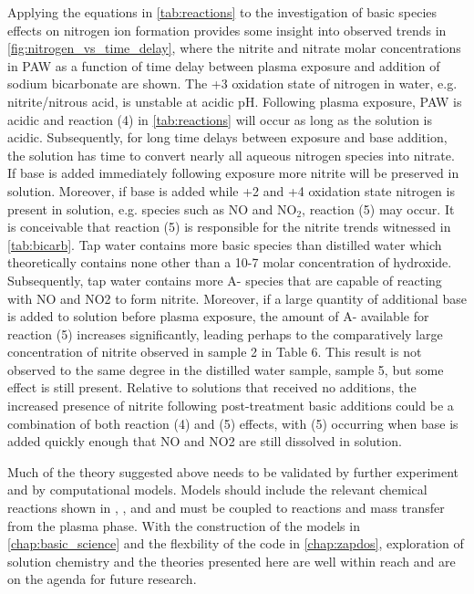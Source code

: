 Applying the equations in \cref{tab:reactions} to the investigation of basic species effects on nitrogen ion formation provides some insight into observed trends in \cref{fig:nitrogen_vs_time_delay}, where the nitrite and nitrate molar concentrations in PAW as a function of time delay between plasma exposure and addition of sodium bicarbonate are shown.  The +3 oxidation state of nitrogen in water, e.g. nitrite/nitrous acid, is unstable at acidic pH.  Following plasma exposure, PAW is acidic and reaction (4) in \cref{tab:reactions} will occur as long as the solution is acidic.  Subsequently, for long time delays between exposure and base addition, the solution has time to convert nearly all aqueous nitrogen species into nitrate.  If base is added immediately following exposure more nitrite will be preserved in solution.  Moreover, if base is added while +2 and +4 oxidation state nitrogen is present in solution, e.g. species such as NO and NO$_2$, reaction (5) may occur.  It is conceivable that reaction (5) is responsible for the nitrite trends witnessed in \cref{tab:bicarb}.  Tap water contains more basic species than distilled water which theoretically contains none other than a 10-7 molar concentration of hydroxide.  Subsequently, tap water contains more A- species that are capable of reacting with NO and NO2 to form nitrite.  Moreover, if a large quantity of additional base is added to solution before plasma exposure, the amount of A- available for reaction (5) increases significantly, leading perhaps to the comparatively large concentration of nitrite observed in sample 2 in Table 6.  This result is not observed to the same degree in the distilled water sample, sample 5, but some effect is still present.  Relative to solutions that received no additions, the increased presence of nitrite following post-treatment basic additions could be a combination of both reaction (4) and (5) effects, with (5) occurring when base is added quickly enough that NO and NO2 are still dissolved in solution.

Much of the theory suggested above needs to be validated by further experiment and by computational models.  Models should include the relevant chemical reactions shown in \cite{moussa2005acidity}, \cite{brisset2012peroxynitrite}, and \cite{greenwood1984chemistry} and must be coupled to reactions and mass transfer from the plasma phase. With the construction of the models in \cref{chap:basic_science} and the flexbility of the code in \cref{chap:zapdos}, exploration of solution chemistry and the theories presented here are well within reach and are on the agenda for future research.

